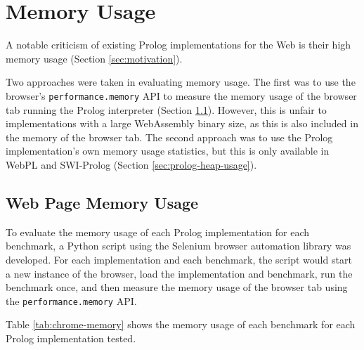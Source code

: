 \section{Memory Usage}

\label{sec:memory-usage}

A notable criticism of existing Prolog implementations for the Web is their high memory usage (Section \ref{sec:motivation}).

Two approaches were taken in evaluating memory usage. The first was to use the browser's \texttt{performance.memory} API to measure the memory usage of the browser tab running the Prolog interpreter (Section \ref{sec:web-page-memory-usage}). However, this is unfair to implementations with a large WebAssembly binary size, as this is also included in the memory of the browser tab. The second approach was to use the Prolog implementation's own memory usage statistics, but this is only available in WebPL and SWI-Prolog (Section \ref{sec:prolog-heap-usage}).

\subsection{Web Page Memory Usage}

\label{sec:web-page-memory-usage}

To evaluate the memory usage of each Prolog implementation for each benchmark, a Python script using the Selenium browser automation library was developed. For each implementation and each benchmark, the script would start a new instance of the browser, load the implementation and benchmark, run the benchmark once, and then measure the memory usage of the browser tab using the \texttt{performance.memory} API.

Table \ref{tab:chrome-memory} shows the memory usage of each benchmark for each Prolog implementation tested.

